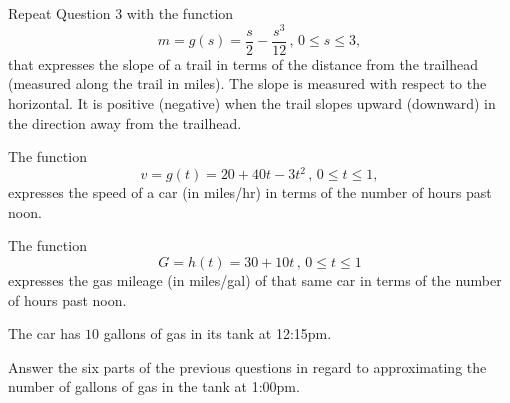 \documentclass{ximera}
\begin{document}
\begin{question}  \label{Q9er34rre}
Repeat Question 3 with the function
\[
   m = g(s) = \frac{s}{2} - \frac{s^3}{12} \, , \, 0\leq s \leq 3 ,
\]
that expresses the slope of a trail in terms of the distance from the trailhead (measured along the trail in miles). The slope is measured with respect to the horizontal. It is positive (negative) when the trail slopes upward (downward) in the direction away from the trailhead.
\end{question}


\begin{question} \label{Q8fre}
The function
\[
      v = g(t) = 20+  40t - 3t^2 \, , \, 0\leq t\leq 1 ,
\]
expresses the speed of a car (in miles/hr) in terms of the number of hours past noon.

The function 
\[
    G = h(t) = 30 + 10t  \, , \, 0\leq t\leq 1
\]
expresses the gas mileage (in miles/gal) of that same car in terms of the number of hours past noon.

The car has $10$ gallons of gas in its tank at 12:15pm.

Answer the six parts of the previous questions in regard to approximating the number of gallons of gas in the tank at 1:00pm.


\end{question}
\end{document}
